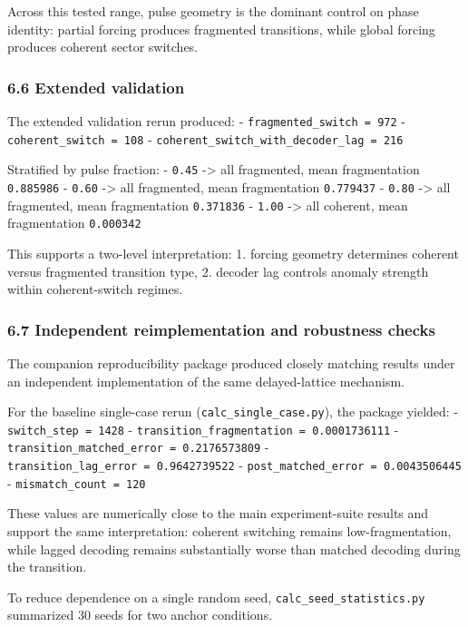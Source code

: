 \documentclass[
]{article}
\begin{document}
Across this tested range, pulse geometry is the dominant control on
phase identity: partial forcing produces fragmented transitions, while
global forcing produces coherent sector switches.

\subsubsection{6.6 Extended validation}\label{extended-validation}

The extended validation rerun produced: -
\texttt{fragmented\_switch\ =\ 972} - \texttt{coherent\_switch\ =\ 108}
- \texttt{coherent\_switch\_with\_decoder\_lag\ =\ 216}

Stratified by pulse fraction: - \texttt{0.45} -\textgreater{} all
fragmented, mean fragmentation \texttt{0.885986} - \texttt{0.60}
-\textgreater{} all fragmented, mean fragmentation \texttt{0.779437} -
\texttt{0.80} -\textgreater{} all fragmented, mean fragmentation
\texttt{0.371836} - \texttt{1.00} -\textgreater{} all coherent, mean
fragmentation \texttt{0.000342}

This supports a two-level interpretation: 1. forcing geometry determines
coherent versus fragmented transition type, 2. decoder lag controls
anomaly strength within coherent-switch regimes.

\subsubsection{6.7 Independent reimplementation and robustness
checks}\label{independent-reimplementation-and-robustness-checks}

The companion reproducibility package produced closely matching results
under an independent implementation of the same delayed-lattice
mechanism.

For the baseline single-case rerun (\texttt{calc\_single\_case.py}), the
package yielded: - \texttt{switch\_step\ =\ 1428} -
\texttt{transition\_fragmentation\ =\ 0.0001736111} -
\texttt{transition\_matched\_error\ =\ 0.2176573809} -
\texttt{transition\_lag\_error\ =\ 0.9642739522} -
\texttt{post\_matched\_error\ =\ 0.0043506445} -
\texttt{mismatch\_count\ =\ 120}

These values are numerically close to the main experiment-suite results
and support the same interpretation: coherent switching remains
low-fragmentation, while lagged decoding remains substantially worse
than matched decoding during the transition.

To reduce dependence on a single random seed,
\texttt{calc\_seed\_statistics.py} summarized 30 seeds for two anchor
conditions.
\end{document}
